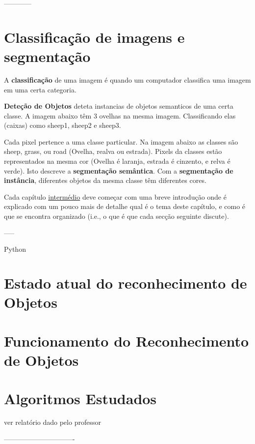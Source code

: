------------


\section{Classificação de imagens e segmentação}

A \textbf{classificação} de uma imagem é quando um computador classifica uma imagem em uma certa categoria. 

\textbf{Deteção de Objetos} deteta instancias de objetos semanticos de uma certa classe. A imagem abaixo têm 3 ovelhas na mesma imagem. Classificando elas (caixas) como sheep1, sheep2 e sheep3.

Cada pixel pertence a uma classe particular. Na imagem abaixo as classes são sheep, grass, ou road (Ovelha, realva ou estrada). Pixels da classes estão representados na mesma cor (Ovelha é laranja, estrada é cinzento, e relva é verde). Isto descreve a \textbf{segmentação semântica}. Com a \textbf{segmentação de instância}, diferentes objetos da mesma classe têm diferentes cores. 







Cada capítulo \underline{intermédio} deve começar com uma breve introdução onde é explicado com um pouco mais de detalhe qual é o tema deste capítulo, e como é que se encontra organizado (i.e., o que é que cada secção seguinte discute). 





-----

Python

\section{Estado atual do reconhecimento de Objetos}
\label{chap2:sec:estado}





\section{Funcionamento do Reconhecimento de Objetos}
\label{chap2:sec:funcionamento}




\section{Algoritmos Estudados}
\label{chap2:sec:algoritmos}


ver relatório dado pelo professor

-------------------------------